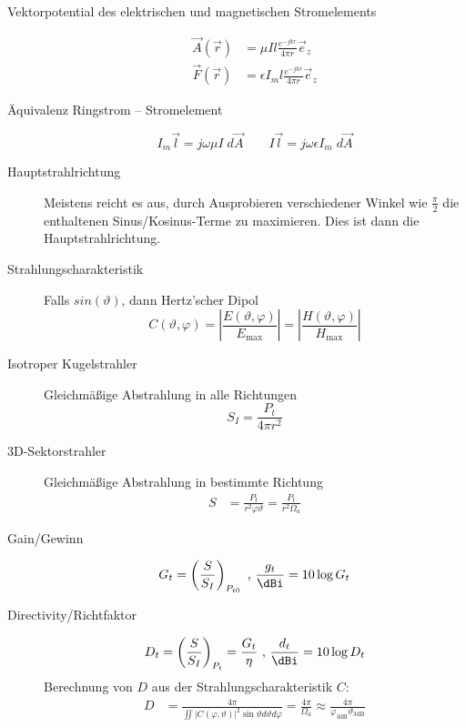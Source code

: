 \begin{description}
\item[Vektorpotential des elektrischen und magnetischen Stromelements]
\begin{align*}
\vec{A} (\vec{r}) &= \mu I l \frac{e^{-jkr}}{4\pi r} \vec{e}_z \\
\vec{F} (\vec{r}) &= \epsilon I_m l \frac{e^{-jkr}}{4\pi r} \vec{e}_z
\end{align*}

\item[Äquivalenz Ringstrom -- Stromelement]
\begin{equation*}
I_m \vec{l} = j\omega\mu I\;d\vec{A} \qquad I \vec{l} = j\omega\epsilon I_m\;d\vec{A}
\end{equation*}

\item[Hauptstrahlrichtung] Meistens reicht es aus, durch Ausprobieren verschiedener Winkel wie $\frac{\pi}{2}$ die enthaltenen Sinus/Kosinus-Terme zu maximieren. Dies ist dann die Hauptstrahlrichtung.

\item[Strahlungscharakteristik] Falls $sin(\vartheta)$, dann Hertz'scher Dipol
\begin{equation*}
C (\vartheta,\varphi) = \left| \frac{E(\vartheta,\varphi)}{E_\text{max}} \right| = \left| \frac{H(\vartheta,\varphi)}{H_\text{max}} \right|
\end{equation*}

\item[Isotroper Kugelstrahler] Gleichmäßige Abstrahlung in alle Richtungen
\begin{equation*}
S_I = \frac{P_t}{4\pi r^2}
\end{equation*}

\item[3D-Sektorstrahler] Gleichmäßige Abstrahlung in bestimmte Richtung
\begin{align*}
S &= \frac{P_t}{r^2 \varphi \vartheta} =\frac{P_t}{r^2 \Omega_a}
\end{align*}

\item[Gain/Gewinn]
\begin{equation*}
G_t = \left( \frac{S}{S_I} \right)_{P_{t0}} \text{ , } \frac{g_t}{\si{\dBi}} = 10\log{G_t}
\end{equation*}

\item[Directivity/Richtfaktor]
\begin{equation*}
D_t = \left(\frac{S}{S_I}\right)_{P_{t}} = \frac{G_t}{\eta} \text{ , } \frac{d_t}{\si{\dBi}} = 10\log{D_t}
\end{equation*}
Berechnung von $D$ aus der Strahlungscharakteristik $C$:
\begin{align*}
D &= \frac{4\pi}{\iint |C(\varphi,\vartheta)|^2 \sin \vartheta d\vartheta d\varphi} = \frac{4\pi}{\Omega_a} \approx \frac{4\pi}{\varphi_\text{3dB} \vartheta_\text{3dB}}
\end{align*}


\end{description}
